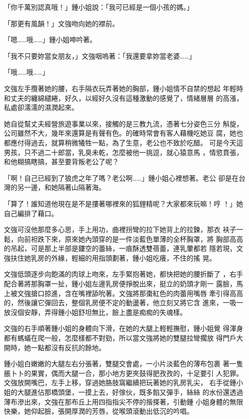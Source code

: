 「你千萬別認真哦！」鍾小姐說：「我可已經是一個小孩的媽。」

「那更有風韻！」文強吻向她的襟前。

「嗯……哦……」鍾小姐呻吟著。

「我不只要妳當女朋友，」文強咽嗚著：「我還要拿妳當老婆……」

「哦……哦……」

文強左手攬著她的腰，右手隔衣玩弄著她的胸部，鍾小姐情不自禁的想起
年輕時和丈夫的纏綿繾綣，好久，以經好久沒有這種激動的感覺了，情緒層層
的高漲，私處卻濡濡的濕潤起來。

她自從幫丈夫經營旅遊事業以來，接觸的是三教九流，憑著七分姿色三分
斛旋，公司雖然不大，幾年來還算是有聲有色。的確時常會有客人藉機吃她豆
腐，她也都應付得過去，就算稍微犧牲一點，為了生意，老公也不致於吃醋。
可是今天這男孩，只不過二十郎當，乳臭未乾，怎麼被他一挑逗，就心猿意馬
，情慾賁張，和他糊搞瞎搞，甚至要背叛老公了呢？

「啊！自己已經到了狼虎之年了嗎？老公啊……」鍾小姐心裡想著。老公
卻是在台灣的另一邊，和她隔著山隔著海。

「算了！誰知道他現在是不是摟著哪裡來的狐貍精呢？大家都來玩嘛！哼
！」她自己編排了藉口。

文強可沒他那麼多心思，手上用功，曲裡拐彎的拉下她背上的拉鍊，那衣
衭子一鬆，向前袒跌下來，原來她內頭穿的是一件淡藍色單薄的全杯胸罩，將
胸部高高的吊起，可是那上半部是鏤空的蕾絲，一痕酥透雙蓓蕾，連乳暈都若
隱若現，文強扶住她乳房的外緣，輕細的用指頭劃著，鍾小姐吃癢，不住的搖
晃。

文強低頭逐步向飽滿的肉球上吻來，左手緊抱著她，都快把她的腰折斷了
，右手配合著將那胸罩一扯，鍾小姐左邊乳房便掙脫出來，挺立的奶頭才剛一
露臉，馬上被文強搶口掠進，含在嘴裡舔吮著。文強將那棗紅色的肉蕾用嘴唇
牽引得高高的，然後讓它彈回去，整個乳房便不定的動盪著，他立刻又將它含
進來，一吸一放沒個安靜，弄得鍾小姐舒坦無比，臉上盡是痴痴的失魂樣。

文強的右手順著鍾小姐的身體向下滑，在她的大腿上輕輕撫慰，鍾小姐覺
得渾身都有螞蟻在爬一般，怎麼樣都不對勁，所以當文強將她的雙腿拉彎擱放
得門戶大開時，她一點都沒有反抗的餘地。

鍾小姐白嫩嫩的大腿左右分張著，雙腿交會處，一小片淡藍色的薄布包裹
著一隻脹卜卜的果實，偶而大腿一合，那小地方更夾鼓得肥孜孜的，十足要引
人犯罪。文強放開嘴巴，左手上移，穿過她胳肢窩繼續把玩著她的乳房乳尖，
右手從鍾小姐的大腿進佔那橋頭堡，一摸上去，好傢伙，既多餡又彈手，絲絲
的水份還透過薄布滲出來，文強在那布丘上用四指指尖不停的揩搽著，引動鍾
小姐身體的無限快樂，她仰起臉，張開厚潤的芳唇，從喉頭滾動出低沉的吟唱。

